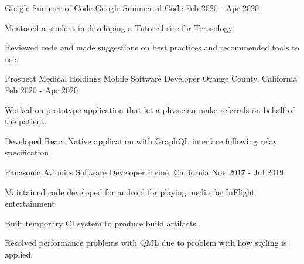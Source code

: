 \begin{cventries}
    \cventry
    {Google Summer of Code} %
    {Google Summer of Code} %
    {} %
    {Feb 2020 - Apr 2020} %
    {
      \begin{cvitems} %
         \item{Mentored a student in developing a Tutorial site for Terasology.}
         \item{Reviewed code and made suggestions on best practices and recommended tools to use.}
      \end{cvitems}
    }
    

    \cventry
    {Prospect Medical Holdings} %
    {Mobile Software Developer} %
    {Orange County, California} %
    {Feb 2020 - Apr 2020} %
    {
      \begin{cvitems} %
         \item {Worked on prototype application that let a physician make referrals on behalf of the patient.}
         \item{Developed React Native application with GraphQL interface following relay specification}
      \end{cvitems}
    }
    


    \cventry
    {Panasonic Avionics} %
    {Software Developer} %
    {Irvine, California} %
    {Nov 2017 - Jul 2019} %
    {
      \begin{cvitems} %
         \item{Maintained code developed for android for playing media for InFlight entertainment.} 
         \item{Built temporary CI system to produce build artifacts.} 
         \item{Resolved performance problems with QML due to problem with how styling is applied.} 
      \end{cvitems}
    }
    
    


\end{cventries}

